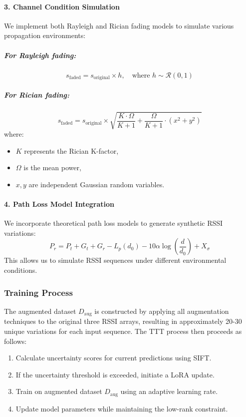 \documentclass[12pt]{article}
\begin{document}
\paragraph{3. Channel Condition Simulation}
We implement both Rayleigh and Rician fading models to simulate various propagation environments:

\subparagraph{For Rayleigh fading:}
\[
s_{\text{faded}} = s_{\text{original}} \times h, \quad \text{where } h \sim \mathcal{R}(0,1)
\]

\subparagraph{For Rician fading:}
\[
s_{\text{faded}} = s_{\text{original}} \times \sqrt{\frac{K\cdot\Omega}{K+1} + \frac{\Omega}{K+1} \cdot (x^2 + y^2)}
\]
where:
\begin{itemize}
    \item \( K \) represents the Rician K-factor,
    \item \( \Omega \) is the mean power,
    \item \( x, y \) are independent Gaussian random variables.
\end{itemize}

\paragraph{4. Path Loss Model Integration}
We incorporate theoretical path loss models to generate synthetic RSSI variations:
\[
P_r = P_t + G_t + G_r - L_p(d_0) - 10\alpha \log\left(\frac{d}{d_0}\right) + X_\sigma
\]
This allows us to simulate RSSI sequences under different environmental conditions.

\subsubsection{Training Process}

The augmented dataset \( D_{\text{aug}} \) is constructed by applying all augmentation techniques to the original three RSSI arrays, resulting in approximately 20-30 unique variations for each input sequence. The TTT process then proceeds as follows:

\begin{enumerate}
    \item Calculate uncertainty scores for current predictions using SIFT.
    \item If the uncertainty threshold is exceeded, initiate a LoRA update.
    \item Train on augmented dataset \( D_{\text{aug}} \) using an adaptive learning rate.
    \item Update model parameters while maintaining the low-rank constraint.
\end{enumerate}
\end{document}
